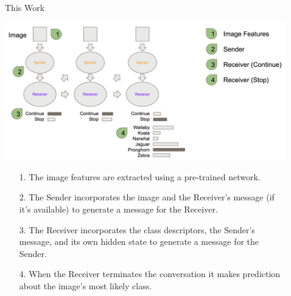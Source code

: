 \documentclass[final]{beamer}
\newlength{\sepwid}
\newlength{\onecolwid}
\begin{document}
\begin{frame}[t]
\begin{columns}[t]
\begin{column}{\onecolwid}
\begin{tcolorbox}[colback=blue!5!white,colframe=blue!75!black]

  
  
\end{tcolorbox}




\end{column} %

\begin{column}{\sepwid}\end{column} %

\begin{column}{\onecolwid}


\begin{block}{This Work}

\begin{center}
\includegraphics[width=0.8\linewidth]{figures/mmg}
\end{center}

\begin{enumerate}
\item[1.] The image features are extracted using a pre-trained network.
\item[2.] The Sender incorporates the image and the Receiver's message (if it's available) to generate a message for the Receiver.
\item[3.] The Receiver incorporates the class descriptors, the Sender's message, and its own hidden state to generate a message for the Sender.
\item[4.] When the Receiver terminates the conversation it makes prediction about the image's most likely class.
\end{enumerate}


\end{block}
\end{column}
\end{columns}
\end{frame}
\end{document}
